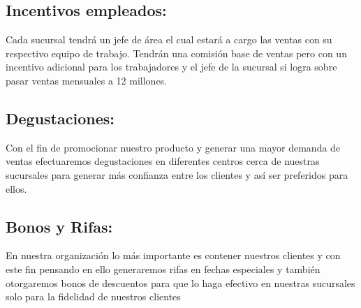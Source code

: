 \subsection{Incentivos empleados:}Cada sucursal tendr\'a un jefe de \'area el cual estar\'a a cargo las ventas con su  respectivo equipo de trabajo.  Tendr\'an una comisi\'on base de ventas pero con un incentivo adicional para los trabajadores y el jefe de la sucursal si logra sobre pasar ventas mensuales a 12 millones.%
\subsection{Degustaciones:} Con el fin de promocionar nuestro producto y generar una mayor demanda de ventas  efectuaremos degustaciones en diferentes centros cerca de nuestras sucursales para generar m\'as confianza entre los clientes y as\'i ser preferidos para ellos.
%
\subsection{Bonos y Rifas:} En nuestra  organizaci\'on lo m\'as importante es contener nuestros clientes y con este fin pensando en ello generaremos rifas en fechas especiales y tambi\'en otorgaremos bonos de descuentos para que lo haga efectivo en nuestras sucursales solo para la fidelidad de nuestros clientes 
\\%
\\%

%
\newpage%

